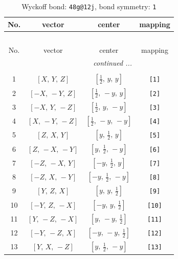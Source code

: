 \documentclass[fleqn,8pt]{jsarticle}
\begin{document}
\begin{longtable}{cccc}
\caption{Wyckoff bond: {\tt 48g@12j}, bond symmetry: {\tt 1}}
 \\
 \hline \hline
No. & vector & center & mapping \\ \hline \endfirsthead

\multicolumn{3}{l}{\tablename\ \thetable{}} \\
 \hline \hline
No. & vector & center & mapping \\ \hline \endhead

 \hline \hline
\multicolumn{3}{r}{\footnotesize\it continued ...} \\ \endfoot

 \hline \hline
\multicolumn{3}{r}{} \\ \endlastfoot

1 & $\left[ X,\, Y,\, Z \right]$ & $\left[ \frac{1}{2},\, y,\, y \right]$ & {\tt [1]} \\ \hline
2 & $\left[ - X,\, - Y,\, Z \right]$ & $\left[ \frac{1}{2},\, - y,\, y \right]$ & {\tt [2]} \\ \hline
3 & $\left[ - X,\, Y,\, - Z \right]$ & $\left[ \frac{1}{2},\, y,\, - y \right]$ & {\tt [3]} \\ \hline
4 & $\left[ X,\, - Y,\, - Z \right]$ & $\left[ \frac{1}{2},\, - y,\, - y \right]$ & {\tt [4]} \\ \hline
5 & $\left[ Z,\, X,\, Y \right]$ & $\left[ y,\, \frac{1}{2},\, y \right]$ & {\tt [5]} \\ \hline
6 & $\left[ Z,\, - X,\, - Y \right]$ & $\left[ y,\, \frac{1}{2},\, - y \right]$ & {\tt [6]} \\ \hline
7 & $\left[ - Z,\, - X,\, Y \right]$ & $\left[ - y,\, \frac{1}{2},\, y \right]$ & {\tt [7]} \\ \hline
8 & $\left[ - Z,\, X,\, - Y \right]$ & $\left[ - y,\, \frac{1}{2},\, - y \right]$ & {\tt [8]} \\ \hline
9 & $\left[ Y,\, Z,\, X \right]$ & $\left[ y,\, y,\, \frac{1}{2} \right]$ & {\tt [9]} \\ \hline
10 & $\left[ - Y,\, Z,\, - X \right]$ & $\left[ - y,\, y,\, \frac{1}{2} \right]$ & {\tt [10]} \\ \hline
11 & $\left[ Y,\, - Z,\, - X \right]$ & $\left[ y,\, - y,\, \frac{1}{2} \right]$ & {\tt [11]} \\ \hline
12 & $\left[ - Y,\, - Z,\, X \right]$ & $\left[ - y,\, - y,\, \frac{1}{2} \right]$ & {\tt [12]} \\ \hline
13 & $\left[ Y,\, X,\, - Z \right]$ & $\left[ y,\, \frac{1}{2},\, - y \right]$ & {\tt [13]} \\ \hline

\end{longtable}
\end{document}
